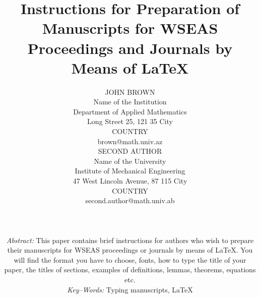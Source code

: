 \documentclass[twocolumn,11pt]{article}
\begin{document}
\global\def\refname{{\normalsize \it References:}}
%
\baselineskip 12.5pt
%
%
%
\title{\LARGE \bf Instructions for Preparation of Manuscripts for
WSEAS Proceedings and Journals by Means of LaTeX}

\date{}

\author{\hspace*{-10pt}
\begin{minipage}[t]{2.7in} \normalsize \baselineskip 12.5pt
\centerline{JOHN BROWN}
\centerline{Name of the Institution}
\centerline{Department of Applied Mathematics}
\centerline{Long Street 25, 121 35 City}
\centerline{COUNTRY}
\centerline{brown@math.univ.az}
\end{minipage} \kern 0in
\begin{minipage}[t]{2.7in} \normalsize \baselineskip 12.5pt
\centerline{SECOND AUTHOR}
\centerline{Name of the University}
\centerline{Institute of Mechanical Engineering}
\centerline{47 West Lincoln Avenue, 87 115 City}
\centerline{COUNTRY}
\centerline{second.author@math.univ.ab}
\end{minipage}
%
%
\\ \\ \hspace*{-10pt}
\begin{minipage}[b]{6.9in} \normalsize
\baselineskip 12.5pt {\it Abstract:}
This paper contains brief instructions for authors who wish to
prepare their manuscripts for WSEAS proceedings or journals by
means of LaTeX. You will find the format you have to choose,
fonts, how to type the title of your paper, the titles of
sections, examples of definitions, lemmas, theorems, equations
etc.
%
\\ [4mm] {\it Key--Words:}
Typing manuscripts, \LaTeX
\end{minipage}
\vspace{-10pt}}

\maketitle

\thispagestyle{empty} \pagestyle{empty}
%
%
\end{document}
